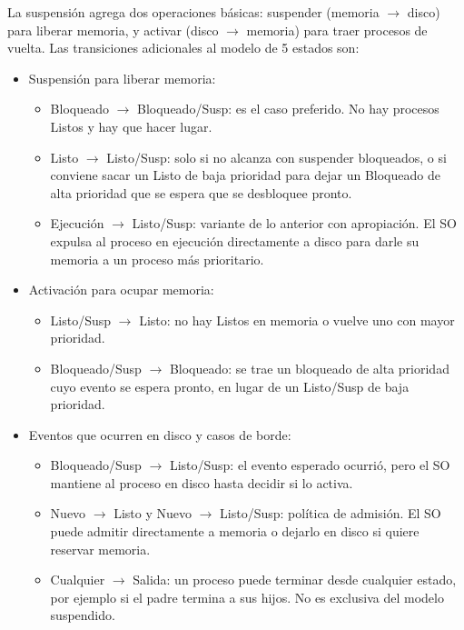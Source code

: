 La suspensión agrega dos operaciones básicas: suspender (memoria $\to$ disco) 
para liberar memoria, y activar (disco $\to$ memoria) para traer procesos de vuelta. Las transiciones adicionales al modelo de 5 estados son:
\begin{itemize}
  \item Suspensión para liberar memoria:
  \begin{itemize}
    \item Bloqueado $\to$ Bloqueado/Susp: es el caso preferido. No hay procesos Listos y hay que hacer lugar.
    \item Listo $\to$ Listo/Susp: solo si no alcanza con suspender bloqueados, o si conviene sacar un Listo de baja prioridad para dejar un Bloqueado de alta prioridad que se espera que se desbloquee pronto.
    \item Ejecución $\to$ Listo/Susp: variante de lo anterior con apropiación. El SO expulsa al proceso en ejecución directamente a disco para darle su memoria a un proceso más prioritario.
  \end{itemize}

  \item Activación para ocupar memoria:
  \begin{itemize}
    \item Listo/Susp $\to$ Listo: no hay Listos en memoria o vuelve uno con mayor prioridad.
    \item Bloqueado/Susp $\to$ Bloqueado: se trae un bloqueado de alta prioridad cuyo evento se espera pronto, en lugar de un Listo/Susp de baja prioridad.
  \end{itemize}

  \item Eventos que ocurren en disco y casos de borde:
  \begin{itemize}
    \item Bloqueado/Susp $\to$ Listo/Susp: el evento esperado ocurrió, pero el SO mantiene al proceso en disco hasta decidir si lo activa.
    \item Nuevo $\to$ Listo y Nuevo $\to$ Listo/Susp: política de admisión. El SO puede admitir directamente a memoria o dejarlo en disco si quiere reservar memoria.
    \item Cualquier $\to$ Salida: un proceso puede terminar desde cualquier estado, por ejemplo si el padre termina a sus hijos. No es exclusiva del modelo suspendido.
  \end{itemize}
\end{itemize}

